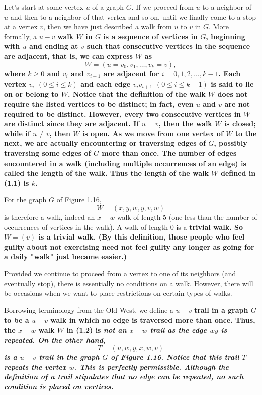 Let's start at some vertex $u$ of a graph $G$. If we proceed from $u$ to a neighbor of $u$ and then to a neighbor of that vertex and so on, until we finally come to a stop at a vertex $v$, then we have just described a walk from $u$ to $v$ in $G$. More formally, a $u-v$ \bf{walk} $W$ in $G$ is a sequence of vertices in $G$, beginning with $u$ and ending at $v$ such that consecutive vertices in the sequence are adjacent, that is, we can express $W$ as
\begin{equation}
W = (u=v_{0},v_{1},\ldots,v_{k}=v),
\end{equation}
where $k \geq 0$ and $v_{i}$ and $v_{i+1}$ are adjacent for $i = 0,1,2,\ldots,k-1$. Each vertex $v_{i}$ $(0 \leq i \leq k)$ and each edge $v_{i}v_{i+1}$ $(0 \leq i \leq k-1)$ is said to lie on or belong to $W$. Notice that the definition of the walk $W$ does not require the listed vertices to be distinct; in fact, even $u$ and $v$ are not required to be distinct. However, every two consecutive vertices in $W$ are distinct since they are adjacent. If $u=v$, then the walk $W$ is \bf{closed}; while if $u \neq v$, then $W$ is \bf{open}. As we move from one vertex of $W$ to the next, we are actually encountering or traversing edges of $G$, possibly traversing some edges of $G$ more than once. The number of edges encountered in a walk (including multiple occurrences of an edge) is called the \bf{length} of the walk. Thus the length of the walk $W$ defined in (1.1) is $k$.

For the graph $G$ of Figure 1.16,
\begin{equation}
W = (x,y,w,y,v,w)
\end{equation}
is therefore a walk, indeed an $x-w$ walk of length 5 (one less than the number of occurrences of vertices in the walk). A walk of length 0 is a \bf{trivial walk}. So $W = (v)$ is a trivial walk. (By this definition, those people who feel guilty about not exercising need not feel guilty any longer as going for a daily "walk" just became easier.)

Provided we continue to proceed from a vertex to one of its neighbors (and eventually stop), there is essentially no conditions on a walk. However, there will be occasions when we want to place restrictions on certain types of walks.



Borrowing terminology from the Old West, we define a $u-v$ \bf{trail} in a graph $G$ to be a $u-v$ walk in which no edge is traversed more than once. Thus, the $x-w$ walk $W$ in (1.2) is \it{not} an $x-w$ trail as the edge $wy$ is repeated. On the other hand,
\begin{equation}
T = (u,w,y,x,w,v)
\end{equation}
is a $u-v$ trail in the graph $G$ of Figure 1.16. Notice that this trail $T$ repeats the vertex $w$. This is perfectly permissible. Although the definition of a trail stipulates that no edge can be repeated, no such condition is placed on vertices.

